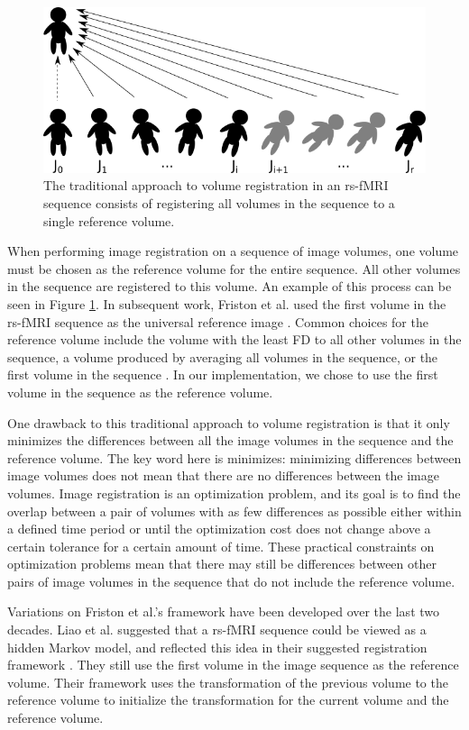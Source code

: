 \begin{figure}
\centering
\includegraphics[width=.7\textwidth]{2/traditional-registration.png}
\caption{The traditional approach to volume registration in an rs-fMRI sequence consists of registering all volumes in the sequence to a single reference volume.}
\label{fig:ch4:traditional-reg}
\end{figure}

When performing image registration on a sequence of image volumes, one volume must be chosen as the reference volume for the entire sequence. All other volumes in the sequence are registered to this volume. An example of this process can be seen in Figure \ref{fig:ch4:traditional-reg}. In subsequent work, Friston et al. used the first volume in the rs-fMRI sequence as the universal reference image \cite{Friston1996}. Common choices for the reference volume include the volume with the least FD to all other volumes in the sequence, a volume produced by averaging all volumes in the sequence, or the first volume in the sequence \cite{Friston1996} \cite{Liao2005}. In our implementation, we chose to use the first volume in the sequence as the reference volume.

One drawback to this traditional approach to volume registration is that it only minimizes the differences between all the image volumes in the sequence and the reference volume. The key word here is minimizes: minimizing differences between image volumes does not mean that there are no differences between the image volumes. Image registration is an optimization problem, and its goal is to find the overlap between a pair of volumes with as few differences as possible either within a defined time period or until the optimization cost does not change above a certain tolerance for a certain amount of time. These practical constraints on optimization problems mean that there may still be differences between other pairs of image volumes in the sequence that do not include the reference volume. 

Variations on Friston et al.'s framework have been developed over the last two decades. Liao et al. suggested that a rs-fMRI sequence could be viewed as a hidden Markov model, and reflected this idea in their suggested registration framework \cite{Liao2016}. They still use the first volume in the image sequence as the reference volume. Their framework uses the transformation of the previous volume to the reference volume to initialize the transformation for the current volume and the reference volume. 

